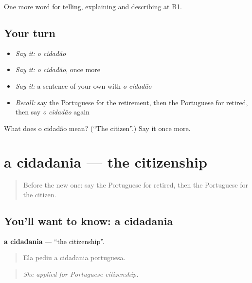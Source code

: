 \begin{grammarlens}[title={What you've built}]
One more word for telling, explaining and describing at B1.
\end{grammarlens}

\subsection*{Your turn}
\begin{itemize}
\raggedright
  \item \emph{Say it:} \emph{o cidadão}
  \item \emph{Say it:} \emph{o cidadão}, once more
  \item \emph{Say it:} a sentence of your own with \emph{o cidadão}
  \item \emph{Recall:} say the Portuguese for the retirement, then the Portuguese for retired, then say \emph{o cidadão} again
\end{itemize}

\begin{tcolorbox}[breakable,colback=teal!4,colframe=teal!35!black,title={Before you move on}]
What does o cidadão mean? (\textquotedblleft{}The citizen\textquotedblright{}.) Say it once more.
\end{tcolorbox}
\section[a cidadania]{a cidadania — the citizenship}

\label{lesson:PT-C363-cidadania}



\begin{quote}
Before the new one: say the Portuguese for retired, then the Portuguese for the citizen.
\end{quote}

\subsection*{You'll want to know: a cidadania}
\textbf{a cidadania} — \textquotedblleft{}the citizenship\textquotedblright{}.

\begin{quote}
Ela pediu a cidadania portuguesa.
\end{quote}

\begin{quote}
\emph{She applied for Portuguese citizenship.}
\end{quote}

